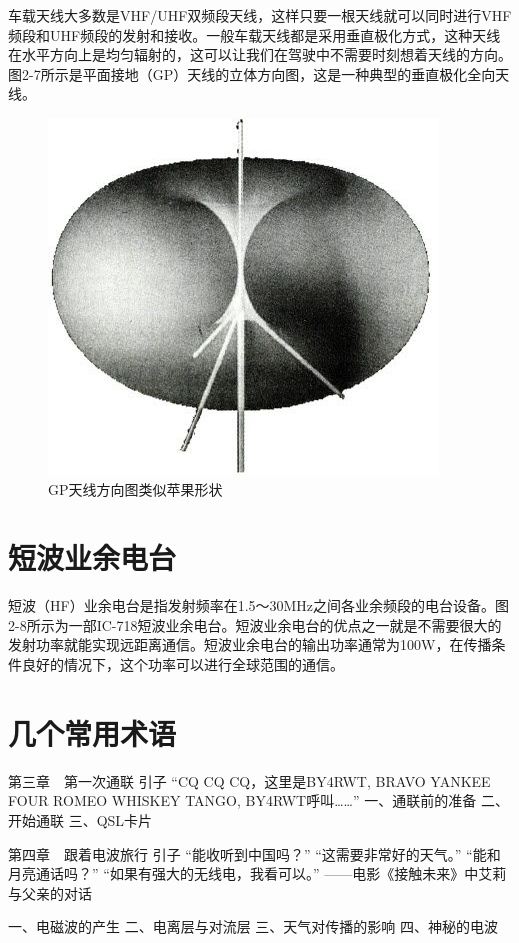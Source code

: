 \documentclass[12pt,UTF8]{ctexbook}
\begin{document}
车载天线大多数是VHF/UHF双频段天线，这样只要一根天线就可以同时进行VHF频段和UHF频段的发射和接收。一般车载天线都是采用垂直极化方式，这种天线在水平方向上是均匀辐射的，这可以让我们在驾驶中不需要时刻想着天线的方向。图2-7所示是平面接地（GP）天线的立体方向图，这是一种典型的垂直极化全向天线。

\begin{figure}[htbp]
	\centering
	\includegraphics[width=0.7\linewidth]{24}
	\caption{GP天线方向图类似苹果形状}
	\label{fig:1}
\end{figure}

\section{短波业余电台}

短波（HF）业余电台是指发射频率在1.5～30MHz之间各业余频段的电台设备。图2-8所示为一部IC-718短波业余电台。短波业余电台的优点之一就是不需要很大的发射功率就能实现远距离通信。短波业余电台的输出功率通常为100W，在传播条件良好的情况下，这个功率可以进行全球范围的通信。



\section{几个常用术语}

第三章　第一次通联
引子
“CQ CQ CQ，这里是BY4RWT, BRAVO YANKEE FOUR ROMEO WHISKEY TANGO, BY4RWT呼叫……”
一、通联前的准备
二、开始通联
三、QSL卡片

第四章　跟着电波旅行
引子
“能收听到中国吗？”
“这需要非常好的天气。”
“能和月亮通话吗？”
“如果有强大的无线电，我看可以。”
——电影《接触未来》中艾莉与父亲的对话

一、电磁波的产生
二、电离层与对流层
三、天气对传播的影响
四、神秘的电波
\end{document}
